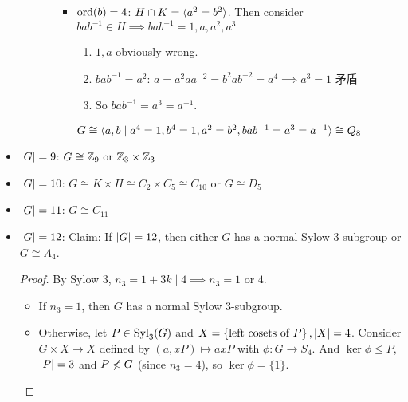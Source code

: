 \begin{itemize}
\begin{itemize}
\begin{itemize}
\begin{itemize}
              \item $\operatorname{ord}(b) = 4$: $H \cap K = \langle a^2 = b^2\rangle$. Then consider $bab^{-1} \in H \implies bab^{-1} = 1,a,a^2,a^3$
                \begin{enumerate}
                  \item $1,a$ obviously wrong.
                  \item $bab^{-1} = a^2$: $a = a^2aa^{-2} = b^2ab^{-2} = a^4 \implies a^3 = 1$ 矛盾
                  \item So $bab^{-1} = a^3 = a^{-1}$.
                \end{enumerate}
                $G \cong \langle a,b \mid a^4 = 1, b^4 = 1, a^2 = b^2, bab^{-1} = a^3 = a^{-1}\rangle \cong Q_8$
            \end{itemize}
        \end{itemize}
    \end{itemize}
  \item $\lvert G\rvert = 9$: $G \cong \mathbb{Z}_9 \text{~or~} \mathbb{Z}_3 \times \mathbb{Z}_3$
  \item $\lvert G\rvert = 10$: $G \cong K \times H \cong C_2 \times C_5 \cong C_{10}$ or $G \cong D_5$
  \item $\lvert G\rvert = 11$: $G \cong C_{11}$
  \item $\lvert G\rvert = 12$: Claim: If $\lvert G\rvert = 12$, then either $G$ has a normal Sylow $3$-subgroup or $G \cong A_4$.
    \begin{proof}
      By Sylow 3, $n_3 = 1+3k \mid 4 \implies n_3 = 1 \text{~or~} 4$.
      \begin{itemize}
        \item If $n_3 = 1$, then $G$ has a normal Sylow $3$-subgroup.
        \item Otherwise, let $P \in \operatorname{Syl}_3(G)$ and $X = \left\{ \text{left cosets of }P \right\}, \lvert X\rvert = 4$.
          Consider $G \times X \to X$ defined by $(a,xP) \mapsto axP$ with $\phi: G \to S_4$.
          And $\ker \phi \le P$, $\lvert P\rvert = 3$ and $P \centernot{\lhd} G$ (since $n_3=4$), so $\ker \phi = \{1\}$.


\end{itemize}
\end{proof}
\end{itemize}

